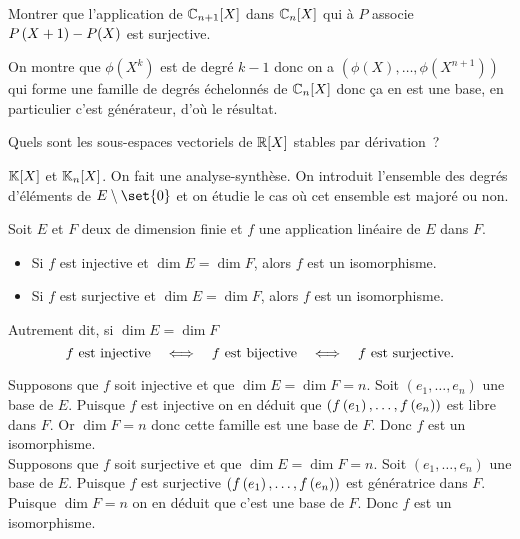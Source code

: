 \documentclass{magnolia}
\begin{document}
\begin{exos}
\exo Montrer que l'application de $\polyC[n+1]$ dans $\polyC[n]$ qui à $P$
  associe $P\left(X+1\right)-P(X)$ est surjective.
  \begin{sol}
  On montre que $\phi(X^k)$ est de degré $k-1$ donc on a $(\phi(X),\ldots,\phi(X^{n+1}))$ qui forme une famille de degrés échelonnés de $\polyC[n]$ donc ça en est une base, en particulier c'est générateur, d'où le résultat.
  \end{sol}
\exo Quels sont les sous-espaces vectoriels de $\polyR$ stables par
  dérivation~?
  \begin{sol}
  $\polyK$ et $\polyK[n]$. On fait une analyse-synthèse. On introduit l'ensemble des degrés d'éléments de $E\setminus\set{0}$ et on étudie le cas où cet ensemble est majoré ou non.
  \end{sol}
\end{exos}

\begin{proposition}[utile=3]
Soit $E$ et $F$ deux \Kevs de dimension finie et $f$ une application linéaire
de $E$ dans $F$.
\begin{itemize}
\item Si $f$ est injective et $\dim E=\dim F$, alors $f$ est un isomorphisme.
\item Si $f$ est surjective et $\dim E=\dim F$, alors $f$ est un isomorphisme.
\end{itemize}
Autrement dit, si $\dim E=\dim F$
\[\text{$f$ est injective} \quad\Longleftrightarrow\quad \text{$f$ est bijective}
   \quad\Longleftrightarrow\quad \text{$f$ est surjective.}\]
\end{proposition}
\begin{preuve}
Supposons que $f$ soit injective et que $\dim E=\dim F=n$. Soit
$(e_1,\ldots,e_n)$ une base de $E$. Puisque $f$ est injective on en déduit que
$(f\left(e_1\right),\ldots,f\left(e_n\right))$ est libre dans $F$. Or $\dim F=n$ donc cette
famille est une base de $F$. Donc $f$ est un isomorphisme.\\
Supposons que $f$ soit surjective et que $\dim E=\dim F=n$. Soit
$(e_1,\ldots,e_n)$ une base de $E$. Puisque $f$ est surjective
$(f\left(e_1\right),\ldots,f\left(e_n\right))$ est génératrice dans $F$. Puisque $\dim F=n$ on
en déduit que c'est une base de $F$. Donc $f$ est un isomorphisme.
\end{preuve}
\end{document}
